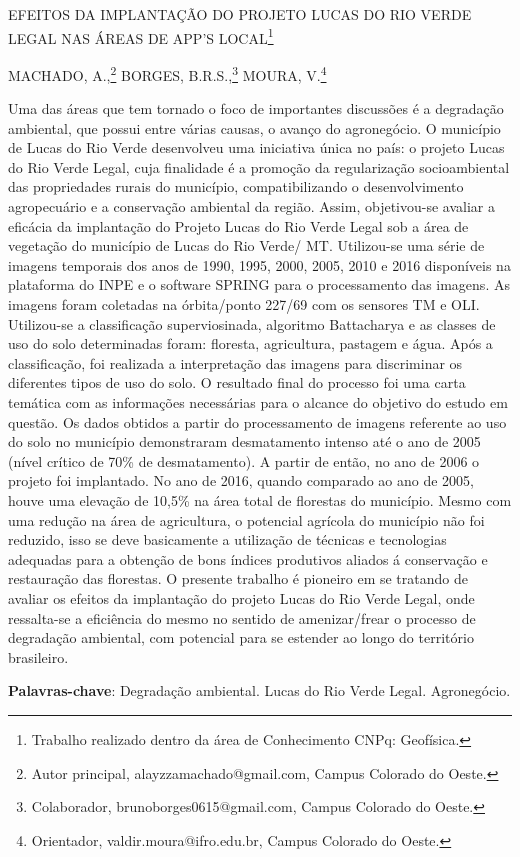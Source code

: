 \documentclass[article,12pt,onesidea,4paper,english,brazil]{abntex2}
\begin{document}
	
	
	\frenchspacing 
	
	\begin{center}
		\LARGE EFEITOS DA IMPLANTAÇÃO DO PROJETO LUCAS DO RIO VERDE LEGAL NAS ÁREAS DE APP’S LOCAL\footnote{Trabalho realizado dentro da área de Conhecimento CNPq: Geofísica.}
		
		\normalsize
		MACHADO, A.,\footnote{Autor principal, alayzzamachado@gmail.com, Campus Colorado do Oeste.} 
	BORGES, B.R.S.,\footnote{Colaborador, brunoborges0615@gmail.com, Campus Colorado do Oeste.} 
		MOURA, V.\footnote{Orientador, valdir.moura@ifro.edu.br, Campus Colorado do Oeste.} 
		
	\end{center}
	
	\noindent Uma das áreas que tem tornado o foco de importantes discussões é a degradação ambiental, que possui entre várias causas, o avanço do agronegócio. O município de Lucas do Rio Verde desenvolveu uma iniciativa única no país: o projeto Lucas do Rio Verde Legal, cuja finalidade é a promoção da regularização socioambiental das propriedades rurais do município, compatibilizando o desenvolvimento agropecuário e a conservação ambiental da região. Assim, objetivou-se avaliar a eficácia da implantação do Projeto Lucas do Rio Verde Legal sob a área de vegetação do município de Lucas do Rio Verde/ MT. Utilizou-se uma série de imagens temporais dos anos de 1990, 1995, 2000, 2005, 2010 e 2016 disponíveis na plataforma do INPE e o software SPRING para o processamento das imagens. As imagens foram coletadas na órbita/ponto 227/69 com os sensores TM e OLI. Utilizou-se a classificação superviosinada, algoritmo Battacharya e as classes de uso do solo determinadas foram: floresta, agricultura, pastagem e água. Após a classificação, foi realizada a interpretação das imagens para discriminar os diferentes tipos de uso do solo. O resultado final do processo foi uma carta temática com as informações necessárias para o alcance do objetivo do estudo em questão. Os dados obtidos a partir do processamento de imagens referente ao uso do solo no município demonstraram desmatamento intenso até o ano de 2005 (nível crítico de 70\% de desmatamento). A partir de então, no ano de 2006 o projeto foi implantado. No ano de 2016, quando comparado ao ano de 2005, houve uma elevação de 10,5\% na área total de florestas do município. Mesmo com uma redução na área de agricultura, o potencial agrícola do município não foi reduzido, isso se deve basicamente a utilização de técnicas e tecnologias adequadas para a obtenção de bons índices produtivos aliados á conservação e restauração das florestas. O presente trabalho é pioneiro em se tratando de avaliar os efeitos da implantação do projeto Lucas do Rio Verde Legal, onde ressalta-se a eficiência do mesmo no sentido de amenizar/frear o processo de degradação ambiental, com potencial para se estender ao longo do território brasileiro.
	
	\vspace{\onelineskip}
	
	\noindent
	\textbf{Palavras-chave}: Degradação ambiental. Lucas do Rio Verde Legal. Agronegócio.
	
\end{document}
